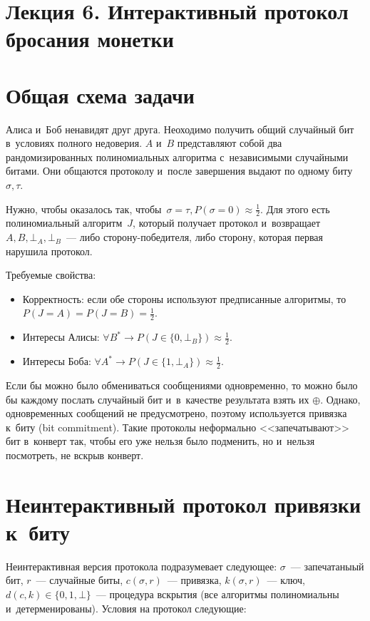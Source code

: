 \documentclass{article}
\begin{document}
\section*{Лекция 6. Интерактивный протокол бросания монетки}
\resetcntrs

\section{Общая схема задачи}

Алиса и~Боб ненавидят друг друга. Неоходимо получить общий случайный бит
в~условиях полного недоверия. $A$ и~$B$ представляют собой два рандомизированных
полиномиальных алгоритма с~независимыми случайными битами. Они общаются
протоколу и~после завершения выдают по одному биту~$\sigma, \tau$.

Нужно, чтобы оказалось так, чтобы~$\sigma = \tau, P(\sigma = 0) \approx
\frac{1}{2}$. Для этого есть полиномиальный алгоритм~$J$, который получает
протокол и~возвращает~$A, B, \bot_A, \bot_B$~--- либо сторону-победителя, либо
сторону, которая первая нарушила протокол.

Требуемые свойства:
\begin{itemize}
	\item Корректность: если обе стороны используют предписанные алгоритмы, то
		$P(J = A) = P(J = B) = \frac{1}{2}$.
	\item Интересы Алисы: $\forall B^\ast \rightarrow P(J \in \{0, \bot_B\})
		\approx \frac{1}{2}$.
	\item Интересы Боба: $\forall A^\ast \rightarrow P(J \in \{1, \bot_A\})
		\approx \frac{1}{2}$.
\end{itemize}

Если бы можно было обмениваться сообщениями одновременно, то можно было бы
каждому послать случайный бит и~в~качестве результата взять их $\oplus$. Однако,
одновременных сообщений не предусмотрено, поэтому используется привязка к~биту
(bit commitment). Такие протоколы неформально <<запечатывают>> бит в~конверт
так, чтобы его уже нельзя было подменить, но и~нельзя посмотреть, не вскрыв
конверт.

\section{Неинтерактивный протокол привязки к~биту}

Неинтерактивная версия протокола подразумевает следующее: $\sigma$~---
запечатаныый бит, $r$~--- случайные биты, $c(\sigma, r)$~--- привязка,
$k(\sigma, r)$~--- ключ, $d(c, k) \in \{0, 1, \bot\}$~--- процедура вскрытия
(все алгоритмы полиномиальны и~детерменированы). Условия на протокол следующие:
\end{document}
